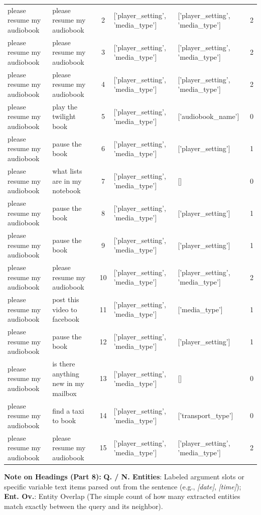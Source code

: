 {\begin{longtable}{p{3.2cm} p{3.2cm} c p{2.4cm} p{2.4cm} c}
please resume my audiobook & please resume my audiobook & 2 & ['player\_setting', 'media\_type'] & ['player\_setting', 'media\_type'] & 2 \\
please resume my audiobook & please resume my audiobook & 3 & ['player\_setting', 'media\_type'] & ['player\_setting', 'media\_type'] & 2 \\
please resume my audiobook & please resume my audiobook & 4 & ['player\_setting', 'media\_type'] & ['player\_setting', 'media\_type'] & 2 \\
please resume my audiobook & play the twilight book & 5 & ['player\_setting', 'media\_type'] & ['audiobook\_name'] & 0 \\
please resume my audiobook & pause the book & 6 & ['player\_setting', 'media\_type'] & ['player\_setting'] & 1 \\
please resume my audiobook & what lists are in my notebook & 7 & ['player\_setting', 'media\_type'] & [] & 0 \\
please resume my audiobook & pause the book & 8 & ['player\_setting', 'media\_type'] & ['player\_setting'] & 1 \\
please resume my audiobook & pause the book & 9 & ['player\_setting', 'media\_type'] & ['player\_setting'] & 1 \\
please resume my audiobook & please resume my audiobook & 10 & ['player\_setting', 'media\_type'] & ['player\_setting', 'media\_type'] & 2 \\
please resume my audiobook & post this video to facebook & 11 & ['player\_setting', 'media\_type'] & ['media\_type'] & 1 \\
please resume my audiobook & pause the book & 12 & ['player\_setting', 'media\_type'] & ['player\_setting'] & 1 \\
please resume my audiobook & is there anything new in my mailbox & 13 & ['player\_setting', 'media\_type'] & [] & 0 \\
please resume my audiobook & find a taxi to book & 14 & ['player\_setting', 'media\_type'] & ['transport\_type'] & 0 \\
please resume my audiobook & please resume my audiobook & 15 & ['player\_setting', 'media\_type'] & ['player\_setting', 'media\_type'] & 2 \\
\bottomrule
\end{longtable}
}
\vspace{0.1cm}
{\footnotesize\noindent\raggedright \textbf{Note on Headings (Part 8):} \textbf{Q. / N. Entities}: Labeled argument slots or specific variable text items parsed out from the sentence (e.g., \textit{[date]}, \textit{[time]}); \textbf{Ent. Ov.}: Entity Overlap (The simple count of how many extracted entities match exactly between the query and its neighbor).\par}
